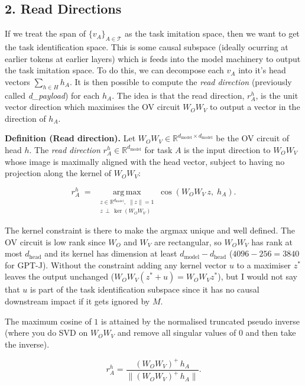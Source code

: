 \documentclass[
]{article}
\begin{document}
\subsection{2. Read Directions}\label{read-directions}

If we treat the span of \(\{v_A\}_{A \in \mathcal{T}}\) as the task
imitation space, then we want to get the task identification space. This
is some causal subspace (ideally ocurring at earlier tokens at earlier
layers) which is feeds into the model machinery to output the task
imitation space. To do this, we can decompose each \(v_A\) into it's
head vectors \(\sum_{h \in H} h_A\). It is then possible to compute the
\emph{read direction} (previously called \emph{d\_payload}) for each
\(h_A\). The idea is that the read direction, \(r^h_A\), is the unit
vector direction which maximises the OV circuit \(W_O W_V\) to output a
vector in the direction of \(h_A\).

\textbf{Definition (Read direction).} Let
\(W_O W_V \in \mathbb{R}^{d_{\mathrm{model}} \times d_{\mathrm{model}}}\)
be the OV circuit of head \(h\). The \emph{read direction}
\(r^h_A \in \mathbb{R}^{d_{\mathrm{model}}}\) for task \(A\) is the
input direction to \(W_O W_V\) whose image is maximally aligned with the
head vector, subject to having no projection along the kernel of
\(W_O W_V\):

\[
r^h_A \;=\; \operatorname*{arg\,max}_{\substack{z \in \mathbb{R}^{d_{\mathrm{model}}},\; \|z\| = 1 \\ z \,\perp\, \ker(W_O W_V)}} \cos\!\left(W_O W_V\, z,\; h_A\right). \tag{1}
\]

The kernel constraint is there to make the argmax unique and well
defined. The OV circuit is low rank since \(W_O\) and \(W_V\) are
rectangular, so \(W_O W_V\) has rank at most \(d_{\mathrm{head}}\) and
its kernel has dimension at least
\(d_{\mathrm{model}} - d_{\mathrm{head}}\) (\(4096 - 256 = 3840\) for
GPT-J). Without the constraint adding any kernel vector \(u\) to a
maximiser \(z^\ast\) leaves the output unchanged
(\(W_O W_V (z^\ast + u) = W_O W_V z^\ast\)), but I would not say that
\(u\) is part of the task identification subspace since it has no causal
downstream impact if it gets ignored by \(M\).

The maximum cosine of \(1\) is attained by the normalised truncated
pseudo inverse (where you do SVD on \(W_O W_V\) and remove all singular
values of 0 and then take the inverse).

\[
r^h_A = \frac{(W_O W_V)^{+}\, h_A}{\|(W_O W_V)^{+}\, h_A\|}. \tag{2}
\]
\end{document}
